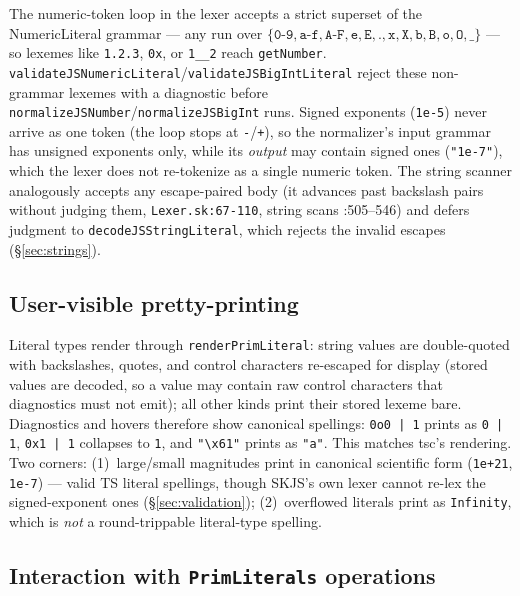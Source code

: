 \documentclass[11pt]{article}
\begin{document}
The numeric-token loop in the lexer accepts a strict superset of the
NumericLiteral grammar --- any run over
$\{\texttt{0-9}, \texttt{a-f}, \texttt{A-F}, \texttt{e}, \texttt{E},
\texttt{.}, \texttt{x}, \texttt{X}, \texttt{b}, \texttt{B}, \texttt{o},
\texttt{O}, \texttt{\_}\}$ --- so lexemes like \texttt{1.2.3},
\texttt{0x}, or \texttt{1\_\_2} reach \texttt{getNumber}.
\texttt{validateJSNumericLiteral}/\texttt{validateJSBigIntLiteral} reject
these non-grammar lexemes with a diagnostic before
\texttt{normalizeJSNumber}/\texttt{normalizeJSBigInt} runs. Signed
exponents (\texttt{1e-5}) never arrive as one token (the loop stops at
\texttt{-}/\texttt{+}), so the normalizer's input grammar has unsigned
exponents only, while its \emph{output} may contain signed ones
(\texttt{"1e-7"}), which the lexer does not re-tokenize as a single
numeric token. The string scanner analogously accepts any
escape-paired body (it advances past backslash pairs without judging
them, \texttt{Lexer.sk:67-110}, string scans :505--546) and defers
judgment to \texttt{decodeJSStringLiteral}, which rejects the invalid
escapes (\S\ref{sec:strings}).

\subsection{User-visible pretty-printing}

Literal types render through \texttt{renderPrimLiteral}: string values
are double-quoted with backslashes, quotes, and control characters
re-escaped for display (stored values are decoded, so a value may
contain raw control characters that diagnostics must not emit); all
other kinds print their stored lexeme bare. Diagnostics and hovers
therefore show canonical spellings: \texttt{0o0 | 1} prints as
\texttt{0 | 1}, \texttt{0x1 | 1} collapses to \texttt{1}, and
\texttt{"\textbackslash x61"} prints as \texttt{"a"}. This matches
tsc's rendering. Two corners: (1)~large/small magnitudes print in
canonical scientific form (\texttt{1e+21}, \texttt{1e-7}) --- valid TS
literal spellings, though SKJS's own lexer cannot re-lex the
signed-exponent ones (\S\ref{sec:validation}); (2)~overflowed literals
print as \texttt{Infinity}, which is \emph{not} a round-trippable
literal-type spelling.

\subsection{Interaction with \texttt{PrimLiterals} operations}
\end{document}
